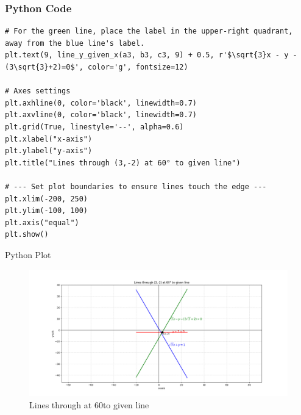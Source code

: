 \documentclass{beamer}
\begin{document}
\begin{frame}[fragile]
    \frametitle{Python Code}
    \begin{lstlisting}
# For the green line, place the label in the upper-right quadrant, away from the blue line's label.
plt.text(9, line_y_given_x(a3, b3, c3, 9) + 0.5, r'$\sqrt{3}x - y -(3\sqrt{3}+2)=0$', color='g', fontsize=12)

# Axes settings
plt.axhline(0, color='black', linewidth=0.7)
plt.axvline(0, color='black', linewidth=0.7)
plt.grid(True, linestyle='--', alpha=0.6)
plt.xlabel("x-axis")
plt.ylabel("y-axis")
plt.title("Lines through (3,-2) at 60° to given line")

# --- Set plot boundaries to ensure lines touch the edge ---
plt.xlim(-200, 250)
plt.ylim(-100, 100)
plt.axis("equal") 
plt.show()
    \end{lstlisting}
\end{frame}


\begin{frame}{Python Plot}
    \begin{figure}
        \centering
        \includegraphics[width=\columnwidth]{../figs/pure_python.png}
        \caption{Lines through  at 60\degree to given line}
        \label{fig:fig}
    \end{figure}
\end{frame}
\end{document}
